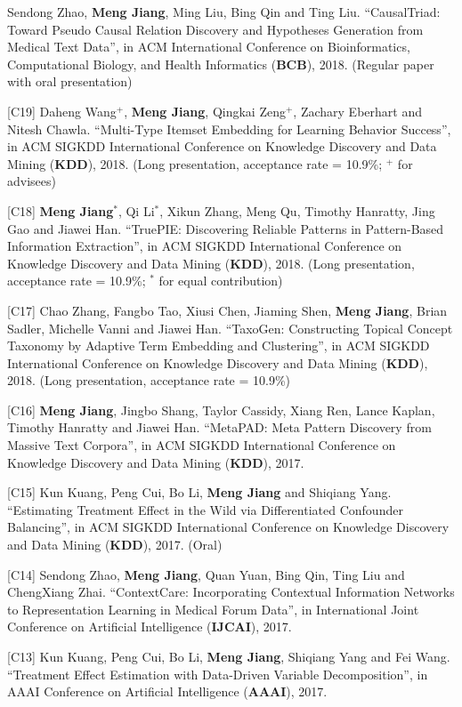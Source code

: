 \documentclass[margin, 9pt]{res}
\begin{document}
\begin{resume}
[C20] Sendong Zhao, \textbf{Meng Jiang}, Ming Liu, Bing Qin and Ting Liu. ``CausalTriad: Toward Pseudo Causal Relation Discovery and Hypotheses Generation from Medical Text Data'', in ACM International Conference on Bioinformatics, Computational Biology, and Health Informatics (\textbf{BCB}), 2018. (Regular paper with oral presentation)

[C19] Daheng Wang${}^{+}$, \textbf{Meng Jiang}, Qingkai Zeng${}^{+}$, Zachary Eberhart and Nitesh Chawla. ``Multi-Type Itemset Embedding for Learning Behavior Success'', in ACM SIGKDD International Conference on Knowledge Discovery and Data Mining (\textbf{KDD}), 2018. (Long presentation, acceptance rate = 10.9\%; ${}^{+}$ for advisees)

[C18] \textbf{Meng Jiang}${}^{*}$, Qi Li${}^{*}$, Xikun Zhang, Meng Qu, Timothy Hanratty, Jing Gao and Jiawei Han. ``TruePIE: Discovering Reliable Patterns in Pattern-Based Information Extraction'', in ACM SIGKDD International Conference on Knowledge Discovery and Data Mining (\textbf{KDD}), 2018. (Long presentation, acceptance rate = 10.9\%; ${}^{*}$ for equal contribution)

[C17] Chao Zhang, Fangbo Tao, Xiusi Chen, Jiaming Shen, \textbf{Meng Jiang}, Brian Sadler, Michelle Vanni and Jiawei Han. ``TaxoGen: Constructing Topical Concept Taxonomy by Adaptive Term Embedding and Clustering'', in ACM SIGKDD International Conference on Knowledge Discovery and Data Mining (\textbf{KDD}), 2018. (Long presentation, acceptance rate = 10.9\%)

[C16] \textbf{Meng Jiang}, Jingbo Shang, Taylor Cassidy, Xiang Ren, Lance Kaplan, Timothy Hanratty and Jiawei Han. ``MetaPAD: Meta Pattern Discovery from Massive Text Corpora'', in ACM SIGKDD International Conference on Knowledge Discovery and Data Mining (\textbf{KDD}), 2017.

[C15] Kun Kuang, Peng Cui, Bo Li, \textbf{Meng Jiang} and Shiqiang Yang. ``Estimating Treatment Effect in the Wild via Differentiated Confounder Balancing'', in ACM SIGKDD International Conference on Knowledge Discovery and Data Mining (\textbf{KDD}), 2017. (Oral)

[C14] Sendong Zhao, \textbf{Meng Jiang}, Quan Yuan, Bing Qin, Ting Liu and ChengXiang Zhai. ``ContextCare: Incorporating Contextual Information Networks to Representation Learning in Medical Forum Data'', in International Joint Conference on Artificial Intelligence (\textbf{IJCAI}), 2017.

[C13] Kun Kuang, Peng Cui, Bo Li, \textbf{Meng Jiang}, Shiqiang Yang and Fei Wang. ``Treatment Effect Estimation with Data-Driven Variable Decomposition'', in AAAI Conference on Artificial Intelligence (\textbf{AAAI}), 2017.


\end{resume}
\end{document}
